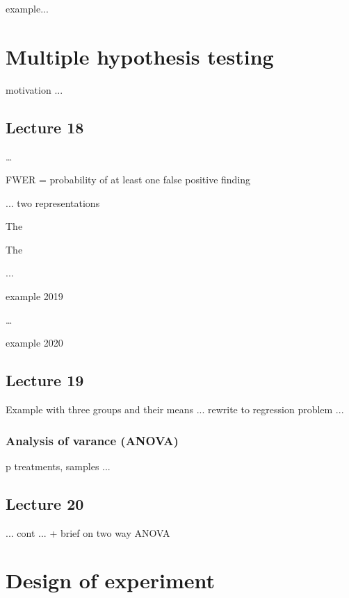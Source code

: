example...

\newpage\section{Multiple hypothesis testing}


motivation ...

\subsection*{Lecture 18}

\dots


FWER = probability of at least one false positive finding


... two representations 


The 

  

The 


...

example 2019 



\dots

example 2020


\subsection*{Lecture 19}

Example with three groups and their means ... rewrite to regression problem ...


 

\subsubsection*{Analysis of varance (ANOVA)}
p treatments, samples ...

 


\subsection*{Lecture  20}


... cont ... + brief on two way ANOVA


\newpage\section{Design of experiment}

